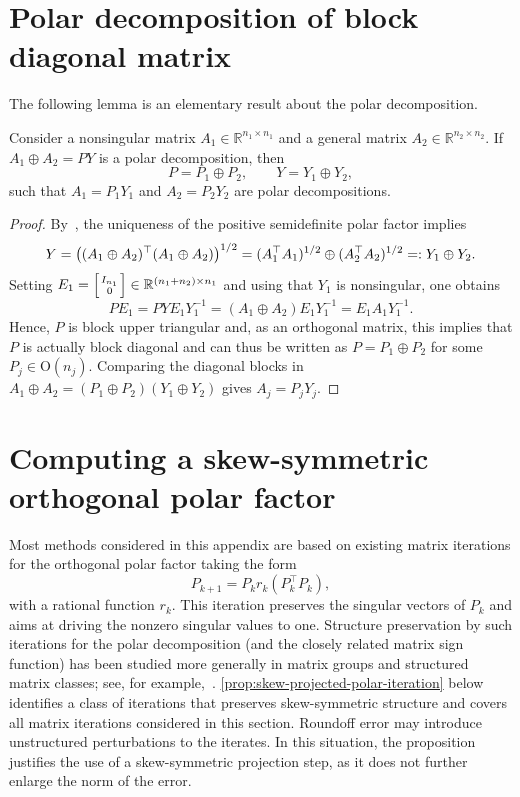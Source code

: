 \documentclass[final,onefignum,onetabnum,dvipsnames]{siamart251216}
\numberwithin{algorithm}{section}
\numberwithin{equation}{section}
\begin{document}
\appendix


\section{Polar decomposition of block diagonal matrix} The following lemma is an elementary result about the polar decomposition.

\begin{lemma} \label{lem:polar_plus}
Consider a nonsingular matrix $A_1 \in \mathbb{R}^{n_1 \times n_1}$ and a general matrix 
$A_2 \in \mathbb{R}^{n_2 \times n_2}$. If
$
    A_1 \oplus A_2 = P Y
$
is a polar decomposition, then
\[
    P = P_1 \oplus P_2,
    \qquad
    Y = Y_1 \oplus Y_2,
\]
such that $A_1 = P_1 Y_1$ and $A_2 = P_2 Y_2$ are polar decompositions. 
\end{lemma}

\begin{proof}
By~\cite[Thm.~7.3.1]{Horn_Johnson_2012}, the uniqueness of the positive semidefinite polar factor implies
\[
Y
=
\bigl((A_1 \oplus A_2)^\top(A_1 \oplus A_2)\bigr)^{1/2} \\
=
(A_1^\top A_1)^{1/2} \oplus (A_2^\top A_2)^{1/2}
=: Y_1 \oplus Y_2.
\]
Setting $E_1 = \Big[ {I_{n_1} \atop 0} \Big] \in \mathbb R^{(n_1+n_2)\times n_1}$ and using that $Y_1$ is nonsingular, one obtains
\[
 P E_1 = P Y E_1 Y_1^{-1} = (A_1 \oplus A_2) E_1 Y_1^{-1} = E_1 A_1 Y_1^{-1}.
\]
Hence, $P$ is block upper triangular and, as an orthogonal matrix, this implies that $P$ is actually block diagonal and can thus be written as $P = P_1 \oplus P_2$ for some 
$P_j\in \mathrm{O}(n_j)$. Comparing the diagonal blocks in
$
    A_1\oplus A_2
    =(P_1\oplus P_2)(Y_1\oplus Y_2)
$
gives $A_j=P_jY_j$.
\end{proof}



\section{Computing a skew-symmetric orthogonal polar factor}\label{sec:app_polar_factor}
Most methods considered in this appendix are based on existing matrix iterations for
the orthogonal polar factor taking the form 
\[
    P_{k+1} = P_k r_k(P_k^\top P_k),
\]
with a rational function $r_k$. This iteration preserves the singular
vectors of $P_k$ and aims at driving the nonzero singular values to one.
Structure preservation by such iterations for the polar decomposition (and the closely related matrix sign function) has been studied more generally in matrix groups and structured matrix classes; see, for
example,~\cite{HMMT04,MR2208338}. \cref{prop:skew-projected-polar-iteration} below identifies a class of iterations that preserves skew-symmetric structure and covers all matrix iterations considered in this section. Roundoff error may introduce unstructured perturbations to the iterates. In this situation, the proposition justifies the use of a skew-symmetric projection step, as it does not further enlarge the norm of the error.
\end{document}
